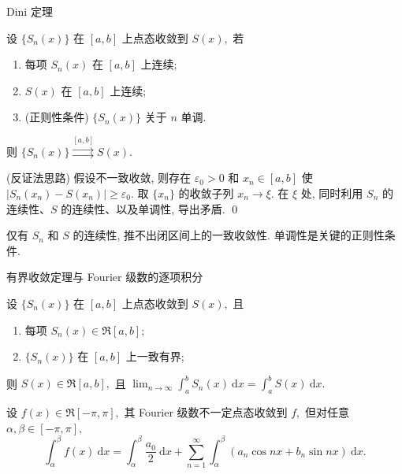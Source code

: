 \begin{frame}{Dini 定理}

\begin{thm}[Dini 定理]
设 $\{S_n(x)\}$ 在 $[a, b]$ 上点态收敛到 $S(x),$ 若
\begin{enumerate}
\item 每项 $S_n(x)$ 在 $[a, b]$ 上连续;
\item $S(x)$ 在 $[a, b]$ 上连续;
\item ({\color{red}正则性条件}) $\{S_n(x)\}$ 关于 $n$ 单调.
\end{enumerate}
则 $\{S_n(x)\} \stackrel{[a, b]}{\rightrightarrows} S(x).$
\end{thm}

\pause

\startproof[bg=yellow, fg=red](反证法思路)
假设不一致收敛, 则存在 $\varepsilon_0 > 0$ 和 $x_n \in [a,b]$ 使 $|S_n(x_n) - S(x_n)| \geqslant \varepsilon_0.$ 取 $\{x_n\}$ 的收敛子列 $x_n \to \xi.$ 在 $\xi$ 处, 同时利用 $S_n$ 的连续性、$S$ 的连续性、以及单调性, 导出矛盾.
\qed

\pause

\begin{attnblock}
仅有 $S_n$ 和 $S$ 的连续性, 推不出{\color{red}闭区间上}的一致收敛性. 单调性是关键的正则性条件.
\end{attnblock}

\end{frame}


\graymode
\begin{frame}{有界收敛定理与 Fourier 级数的逐项积分}

\begin{thm}[有界收敛定理]
设 $\{S_n(x)\}$ 在 $[a, b]$ 上点态收敛到 $S(x),$ 且
\begin{enumerate}
\item 每项 $S_n(x) \in \mathfrak{R}[a,b];$
\item $\{S_n(x)\}$ 在 $[a, b]$ 上{\color{red}一致有界};
\end{enumerate}
则 $S(x) \in \mathfrak{R}[a,b],$ 且 $\lim_{n\to\infty} \int_a^b S_n(x) ~ \mathrm{d}x = \int_a^b S(x) ~ \mathrm{d}x.$
\end{thm}

\pause

\begin{thm}
设 $f(x) \in \mathfrak{R}[-\pi, \pi],$ 其 Fourier 级数不一定点态收敛到 $f,$ 但对任意 $\alpha, \beta \in [-\pi, \pi],$
\[\int_\alpha^\beta f(x) ~ \mathrm{d}x = \int_\alpha^\beta \frac{a_0}{2} ~ \mathrm{d}x + \sum_{n=1}^\infty \int_\alpha^\beta (a_n \cos nx + b_n \sin nx) ~ \mathrm{d}x.\]
\end{thm}

\end{frame}
\normalmode

